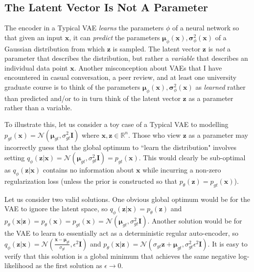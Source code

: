 \documentclass{article}
\begin{document}
\subsection{The Latent Vector Is Not A Parameter}
\label{sec:latentparameter}
The encoder in a Typical VAE \emph{learns} the parameters $\phi$ of a neural network so that given an input $\mathbf{x}$, it can \emph{predict} the parameters $\boldsymbol \mu_\phi(\mathbf{x}), \boldsymbol \sigma^2_\phi(\mathbf{x})$ of a Gaussian distribution from which $\mathbf{z}$ is sampled.  
The latent vector $\mathbf{z}$ is \emph{not} a parameter that describes the distribution, but rather a \emph{variable} that describes an individual data point $\mathbf{x}$.
Another misconception about VAEs that I have encountered in casual conversation, a peer review, and at least one university graduate course is to think of the parameters $\boldsymbol \mu_\phi(\mathbf{x}), \boldsymbol \sigma^2_\phi(\mathbf{x})$ as \emph{learned} rather than predicted and/or to in turn think of the latent vector $\mathbf{z}$ as a parameter rather than a variable.


To illustrate this, let us consider a toy case of a Typical VAE to modelling $p_{gt}(\mathbf{x}) = \mathcal{N}(\boldsymbol \mu_{gt}, \sigma^2_{gt} \mathbf{I})$ where $\mathbf{x}, \mathbf{z} \in\mathbb{R}^n$.
Those who view $\mathbf{z}$ as a parameter may incorrectly guess that the global optimum to ``learn the distribution" involves setting $q_\phi(\mathbf{z}|\mathbf{x}) = \mathcal{N}(\boldsymbol \mu_{gt}, \sigma^2_{gt} \mathbf{I}) = p_{gt}(\mathbf{x})$.
This would clearly be sub-optimal as $q_\phi(\mathbf{z}|\mathbf{x})$ contains no information about $\mathbf{x}$ while incurring a non-zero regularization loss (unless the prior is constructed so that $p_\theta(\mathbf{z}) = p_{gt}(\mathbf{x})$).

Let us consider two valid solutions. One obvious global optimum would be for the VAE to ignore the latent space, so $q_\phi(\mathbf{z}|\mathbf{x}) = p_\theta(\mathbf{z})$ and $p_\theta(\mathbf{x}|\mathbf{z}) = p_\theta(\mathbf{x}) = p_{gt}(\mathbf{x}) = \mathcal{N}(\boldsymbol \mu_{gt}, \sigma^2_{gt} \mathbf{I})$.
Another solution would be for the VAE to learn to essentially act as a deterministic regular auto-encoder, so $q_\phi(\mathbf{z}|\mathbf{x}) = \mathcal{N}(\frac{\mathbf{x} - \boldsymbol \mu_{gt}}{\sigma_{gt}}, \epsilon^2 \mathbf{I})$ and $p_\theta(\mathbf{x}|\mathbf{z}) = \mathcal{N}(\sigma_{gt}\mathbf{z} +\boldsymbol \mu_{gt}, \sigma^2_{gt} \epsilon^2 \mathbf{I})$. It is easy to verify that this solution is a global minimum that achieves the same negative log-likelihood as the first solution as $\epsilon \to 0$.
\end{document}
